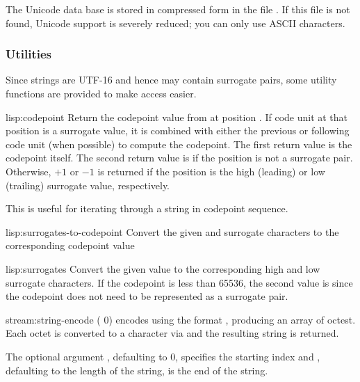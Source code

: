 The Unicode data base is stored in compressed form in the file
.  If this file is not found, Unicode
support is severely reduced; you can only use ASCII characters.

\subsubsection{Utilities}

Since strings are UTF-16 and hence may contain surrogate pairs, some
utility functions are provided to make access easier.

\begin{defun}{lisp:}{codepoint}{\args {} 
    \ampoptional{} }
  Return the codepoint value from  at position .
  If code unit at that position is a surrogate value, it is combined
  with either the previous or following code unit (when possible) to
  compute the codepoint.  The first return value is the codepoint
  itself.  The second return value is \nil{} if the position is not a
  surrogate pair.  Otherwise, $+1$ or $-1$ is returned if the position
  is the high (leading) or low (trailing) surrogate value, respectively.

  This is useful for iterating through a string in codepoint sequence.
\end{defun}

\begin{defun}{lisp:}{surrogates-to-codepoint}{\args {} }
  Convert the given  and  surrogate characters to the
  corresponding codepoint value
\end{defun}

\begin{defun}{lisp:}{surrogates}{\args {}}
  Convert the given  value to the corresponding high
  and low surrogate characters.  If the codepoint is less than 65536,
  the second value is \nil{} since the codepoint does not need to be
  represented as a surrogate pair.
\end{defun}

\begin{defun}{stream:}{string-encode}{\args {}
     \ampoptional{} ( 0) }
   encodes  using the format
  , producing an array of octest.  Each octet is
  converted to a character via  and the resulting
  string is returned.

  The optional argument , defaulting to 0, specifies the
  starting index and , defaulting to the length of the
  string, is the end of the string.
\end{defun}

